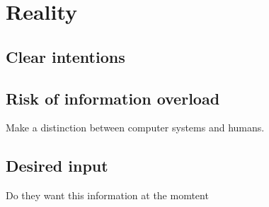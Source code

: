 \chapter{Reality}

\section{Clear intentions}

\section{Risk of information overload}
Make a distinction between computer systems and humans.

\section{Desired input}
Do they want this information at the momtent 